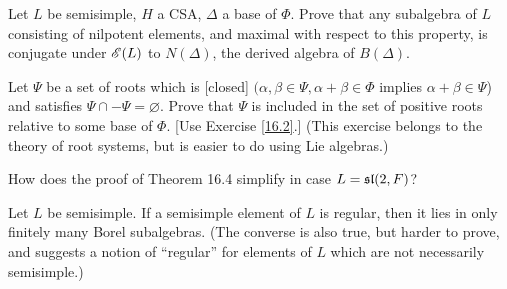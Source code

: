 \begin{ex}\label{16.2}
  Let $L$ be semisimple, $H$ a CSA, $\Delta$ a base of $\Phi$. Prove that any subalgebra of $L$ consisting of nilpotent elements, and maximal with respect to this property, is conjugate under $\Eee(L)$ to $N(\Delta)$, the derived algebra of $B(\Delta)$.
\end{ex}

\begin{ex}
  Let $\Psi$ be a set of roots which is [closed] $(\alpha, \beta \in\Psi, \alpha+\beta \in\Phi$ implies $\alpha+\beta\in\Psi$) and satisfies $\Psi\cap -\Psi=\varnothing$.
  Prove that $\Psi$ is included in the set of positive roots relative to some base of $\Phi$. [Use Exercise \ref{16.2}.] (This exercise
belongs to the theory of root systems, but is easier to do using Lie algebras.)
\end{ex}

\begin{ex}
  How does the proof of Theorem 16.4 simplify in case $L = \sl(2, F)$?
\end{ex}

\begin{ex}
  Let $L$ be semisimple. If a semisimple element of $L$ is regular, then it lies in only finitely many Borel subalgebras. (The converse is also true, but harder to prove, and suggests a notion of ``regular'' for elements of $L$ which are not necessarily semisimple.)
\end{ex}